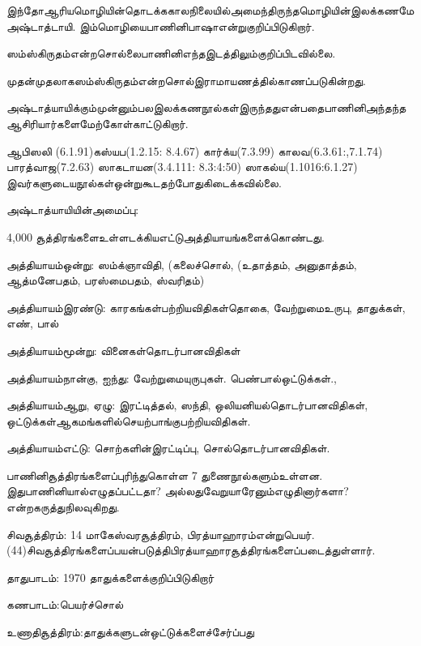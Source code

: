  இந்தோஆரியமொழியின்தொடக்ககாலநிலையில்அமைந்திருந்தமொழியின்இலக்கணமேஅஷ்டாத்டாயி. இம்மொழியைபாணினிபாஷாஎன்றுகுறிப்பிடுகிறார். 

ஸம்ஸ்கிருதம்என்றசொல்லைபாணினிஎந்தஇடத்திலும்குறிப்பிடவில்லை. 

முதன்முதலாகஸம்ஸ்கிருதம்என்றசொல்இராமாயணத்தில்காணப்படுகின்றது. 

அஷ்டாத்யாயிக்கும்முன்னும்பலஇலக்கணநூல்கள்இருந்ததுஎன்பதைபாணினிஅந்தந்தஆசிரியார்களைமேற்கோள்காட்டுகிறார். 

ஆபிஸலி (6.1.91)கஸ்யப(1.2.15: 8.4.67) கார்க்ய(7.3.99) காலவ(6.3.61:,7.1.74) பாரத்வாஜ(7.2.63) ஸாகடாயன(3.4.111: 8.3:4:50) ஸாகல்ய(1.1016:6.1.27) இவர்களுடையநூல்கள்ஒன்றுகூடதற்போதுகிடைக்கவில்லை.


அஷ்டாத்யாயியின்அமைப்பு:

4,000 சூத்திரங்களைஉள்ளடக்கியஎட்டுஅத்தியாயங்களைக்கொண்டது.

\item அத்தியாயம்ஒன்று: ஸம்க்ஞாவிதி, (கலைச்சொல், (உதாத்தம், அனுதாத்தம், ஆத்மனேபதம், பரஸ்மைபதம், ஸ்வரிதம்)

 \item அத்தியாயம்இரண்டு: காரகங்கள்பற்றியவிதிகள்தொகை, வேற்றுமைஉருபு, தாதுக்கள், எண், பால்

 \item அத்தியாயம்மூன்று: வினைகள்தொடர்பானவிதிகள்

 \item அத்தியாயம்நான்கு, ஐந்து: வேற்றுமையுருபுகள். பெண்பால்ஒட்டுக்கள்.,

 \item அத்தியாயம்ஆறு, ஏழு: இரட்டித்தல், ஸந்தி, ஒலியனியல்தொடர்பானவிதிகள், ஒட்டுக்கள்ஆகமங்களில்செயற்பாங்குபற்றியவிதிகள்.

 \item அத்தியாயம்எட்டு: சொற்களின்இரட்டிப்பு, சொல்தொடர்பானவிதிகள்.

பாணினிசூத்திரங்களைப்புரிந்துகொள்ள 7 துணைநூல்களும்உள்ளன. இதுபாணினியால்எழுதப்பட்டதா? அல்லதுவேறுயாரேனும்எழுதினார்களா? என்றகருத்துநிலவுகிறது.

\item சிவசூத்திரம்: 14 மாகேஸ்வரசூத்திரம், பிரத்யாஹாரம்என்றுபெயர். (44)சிவசூத்திரங்களைப்பயன்படுத்திபிரத்யாஹாரசூத்திரங்களைப்படைத்துள்ளார்.

 \item தாதுபாடம்: 1970 தாதுக்களைக்குறிப்பிடுகிறார்

 \item கணபாடம்:பெயர்ச்சொல்

 \item உணாதிசூத்திரம்:தாதுக்களுடன்ஒட்டுக்களைச்சேர்ப்பது

